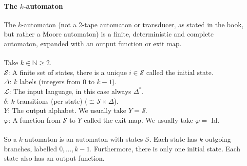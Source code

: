 \documentclass{article}
\begin{document}
\paragraph{The $k$-automaton}
The $k$-automaton (not a 2-tape automaton or transducer, as stated in the
book, but rather a Moore automaton) is a finite, deterministic and complete
automaton, expanded with an output function or exit map.\\
\\
Take $k \in \mathbb{N} \ge 2$.\\
$\mathcal{S}$: A finite set of states, there is a unique $i \in \mathcal{S}$
called the initial state.\\
$\Delta$: $k$ labels (integers from 0 to $k - 1$).\\
$\mathcal{L}$: The input language, in this case always $\Delta^*$.\\
$\delta$: $k$ transitions (per state) ($\cong \mathcal{S} \times \Delta$).\\
$Y$: The output alphabet. We usually take $Y = \mathcal{S}$.\\
$\varphi$: A function from $\mathcal{S}$ to $Y$ called the exit map. We
           usually take $\varphi =$ Id.\\
\\
So a $k$-automaton is an automaton with
states $\mathcal{S}$. Each state has $k$ outgoing branches, labelled
$0, ..., k - 1$. Furthermore, there is only one initial state. Each state also
has an output function.
\end{document}

